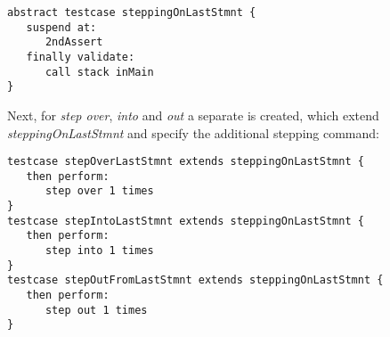 \begin{lstlisting}[language=testingDSL]
abstract testcase steppingOnLastStmnt {
   suspend at: 
      2ndAssert
   finally validate:
      call stack inMain
}
\end{lstlisting}

Next, for \emph{step over}, \emph{into} and \emph{out} a separate
 is created, which extend \emph{steppingOnLastStmnt} and
specify the additional stepping command:

\begin{lstlisting}[language=testingDSL]
testcase stepOverLastStmnt extends steppingOnLastStmnt {            
   then perform:                         
      step over 1 times                            
}
testcase stepIntoLastStmnt extends steppingOnLastStmnt {            
   then perform:                         
      step into 1 times                            
}
testcase stepOutFromLastStmnt extends steppingOnLastStmnt {            
   then perform:                         
      step out 1 times                            
}
\end{lstlisting}		
			
	